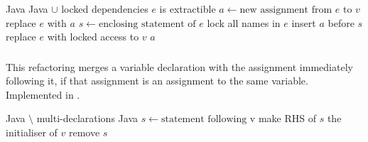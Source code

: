 \begin{algorithm}
\caption{$\refactoring{Extract Assignment}(v : \type{LocalVar}, e : \type{Expr}) : \type{Assignment}$}
\label{alg:ExtractAssignment}
\begin{algorithmic}[1]
\REQUIRE Java
\ENSURE Java $\cup$ locked dependencies
\medskip
\STATE \assert $e$ is extractible
\STATE $a \leftarrow \text{new assignment from $e$ to $v$}$
  \STATE replace $e$ with $a$
\ELSE
  \STATE $s \leftarrow \text{enclosing statement of $e$}$
  \STATE lock all names in $e$
  \STATE insert $a$ before $s$
  \STATE replace $e$ with locked access to $v$
\ENDIF
\RETURN $a$
\end{algorithmic}
\end{algorithm}

\subsubsection{}
This refactoring merges a variable declaration with the assignment immediately following it, if that assignment is an assignment to the same variable. Implemented in .

\begin{algorithm}
\caption{$\refactoring{Merge Variable Declaration}(v : \type{LocalVar})$}
\label{alg:MergeVariableDeclaration}
\begin{algorithmic}[1]
\REQUIRE Java $\setminus$ multi-declarations
\ENSURE Java
\medskip
{}
  \RETURN
\ENDIF
\STATE $s \leftarrow \text{statement following v}$
  \STATE make RHS of $s$ the initialiser of $v$
  \STATE remove $s$
\ENDIF
\end{algorithmic}
\end{algorithm}
